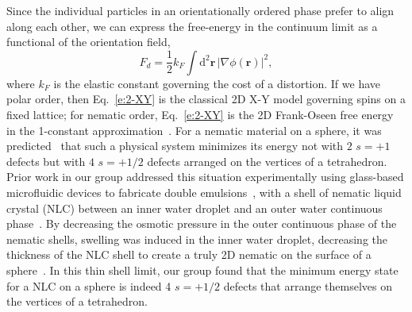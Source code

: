 Since the individual particles in an orientationally ordered phase prefer to align along each other, we can express the free-energy in the continuum limit as a functional of the orientation field,
\begin{equation}
  F_d = \frac{1}{2} k_F \int \textrm{d}^2\mathbf{r} \, |\nabla \phi(\mathbf{r})|^2,\label{e:2-XY}
\end{equation}
where $k_F$ is the elastic constant governing the cost of a distortion.
If we have polar order, then Eq.~\ref{e:2-XY} is the classical 2D X-Y model governing spins on a fixed lattice; for nematic order, Eq.~\ref{e:2-XY} is the 2D Frank-Oseen free energy~\cite{RN61} in the 1-constant approximation~\cite{RN33}.
For a nematic material on a sphere, it was predicted~\cite{RN42,RN104,RN43} that such a physical system minimizes its energy not with $2$ $s=+1$ defects but with $4$ $s=+1/2$ defects arranged on the vertices of a tetrahedron.
Prior work in our group addressed this situation experimentally using glass-based microfluidic devices to fabricate double emulsions~\cite{RN272}, with a shell of nematic liquid crystal (NLC) between an inner water droplet and an outer water continuous phase~\cite{RN105,RN45}.
By decreasing the osmotic pressure in the outer continuous phase of the nematic shells, swelling was induced in the inner water droplet, decreasing the thickness of the NLC shell to create a truly 2D nematic on the surface of a sphere~\cite{RN45}.
In this thin shell limit, our group found that the minimum energy state for a NLC on a sphere is indeed 4 $s = +1/2$ defects that arrange themselves on the vertices of a tetrahedron.

